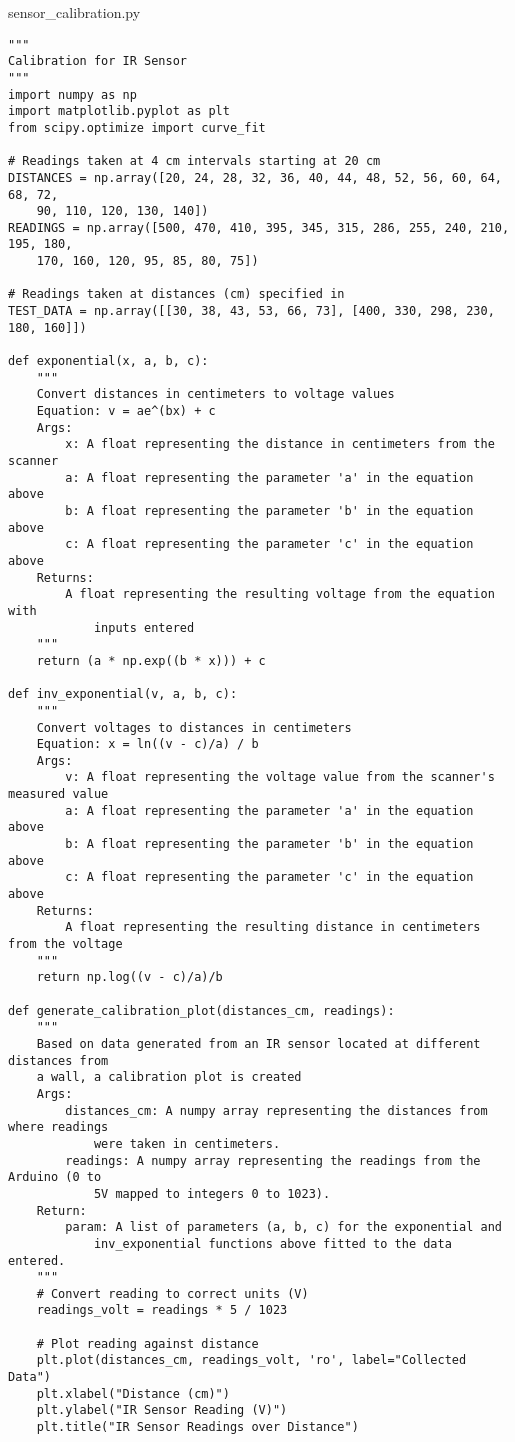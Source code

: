 \documentclass{article}
\begin{document}
\begin{tcolorbox}
sensor\_calibration.py
\begin{verbatim}
"""
Calibration for IR Sensor
"""
import numpy as np
import matplotlib.pyplot as plt
from scipy.optimize import curve_fit

# Readings taken at 4 cm intervals starting at 20 cm
DISTANCES = np.array([20, 24, 28, 32, 36, 40, 44, 48, 52, 56, 60, 64, 68, 72,
    90, 110, 120, 130, 140])
READINGS = np.array([500, 470, 410, 395, 345, 315, 286, 255, 240, 210, 195, 180,
    170, 160, 120, 95, 85, 80, 75])

# Readings taken at distances (cm) specified in
TEST_DATA = np.array([[30, 38, 43, 53, 66, 73], [400, 330, 298, 230, 180, 160]])

def exponential(x, a, b, c):
    """
    Convert distances in centimeters to voltage values
    Equation: v = ae^(bx) + c
    Args:
        x: A float representing the distance in centimeters from the scanner
        a: A float representing the parameter 'a' in the equation above
        b: A float representing the parameter 'b' in the equation above
        c: A float representing the parameter 'c' in the equation above
    Returns:
        A float representing the resulting voltage from the equation with
            inputs entered
    """
    return (a * np.exp((b * x))) + c

def inv_exponential(v, a, b, c):
    """
    Convert voltages to distances in centimeters
    Equation: x = ln((v - c)/a) / b
    Args:
        v: A float representing the voltage value from the scanner's measured value
        a: A float representing the parameter 'a' in the equation above
        b: A float representing the parameter 'b' in the equation above
        c: A float representing the parameter 'c' in the equation above
    Returns:
        A float representing the resulting distance in centimeters from the voltage
    """
    return np.log((v - c)/a)/b

def generate_calibration_plot(distances_cm, readings):
    """
    Based on data generated from an IR sensor located at different distances from
    a wall, a calibration plot is created
    Args:
        distances_cm: A numpy array representing the distances from where readings
            were taken in centimeters.
        readings: A numpy array representing the readings from the Arduino (0 to
            5V mapped to integers 0 to 1023).
    Return:
        param: A list of parameters (a, b, c) for the exponential and
            inv_exponential functions above fitted to the data entered.
    """
    # Convert reading to correct units (V)
    readings_volt = readings * 5 / 1023

    # Plot reading against distance
    plt.plot(distances_cm, readings_volt, 'ro', label="Collected Data")
    plt.xlabel("Distance (cm)")
    plt.ylabel("IR Sensor Reading (V)")
    plt.title("IR Sensor Readings over Distance")
\end{verbatim}
\end{tcolorbox}
\end{document}
